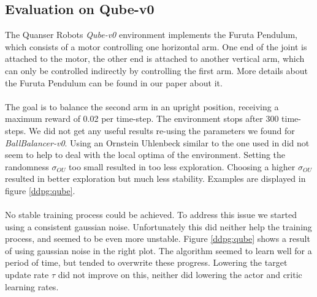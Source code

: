 \subsection{Evaluation on Qube-v0}
The Quanser Robots \textit{Qube-v0} environment implements the Furuta Pendulum, which consists of a motor controlling one horizontal arm. One end of the joint is attached to the motor, the other end is attached to another vertical arm, which can only be controlled indirectly by controlling the first arm. More details about the Furuta Pendulum can be found in our paper about it.\\
\\
The goal is to balance the second arm in an upright position, receiving a maximum reward of 0.02 per time-step. The environment stops after 300 time-steps. We did not get any useful results re-using the parameters we found for \textit{BallBalancer-v0}. Using an Ornstein Uhlenbeck similar to the one used in \citep{lillicrap2015continuous} did not seem to help to deal with the local optima of the environment. Setting the randomness $\sigma_{OU}$ too small resulted in too less exploration. Choosing a higher $\sigma_{OU}$ resulted in better exploration but much less stability. Examples are displayed in figure \ref{ddpg:qube}.\\
\\
No stable training process could be achieved. To address this issue we started using a consistent gaussian noise. Unfortunately this did neither help the training process, and seemed to be even more unstable. Figure \ref{ddpg:qube} shows a result of using gaussian noise in the right plot. The algorithm seemed to learn well for a period of time, but tended to overwrite these progress. Lowering the target update rate $\tau$ did not improve on this, neither did lowering the actor and critic learning rates.
